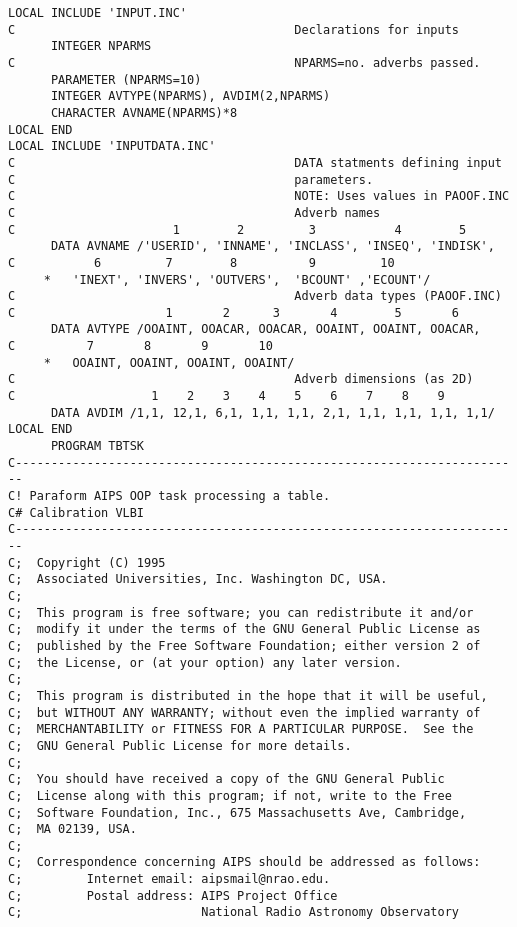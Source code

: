 {\small\begin{verbatim}
LOCAL INCLUDE 'INPUT.INC'
C                                       Declarations for inputs
      INTEGER NPARMS
C                                       NPARMS=no. adverbs passed.
      PARAMETER (NPARMS=10)
      INTEGER AVTYPE(NPARMS), AVDIM(2,NPARMS)
      CHARACTER AVNAME(NPARMS)*8
LOCAL END
LOCAL INCLUDE 'INPUTDATA.INC'
C                                       DATA statments defining input
C                                       parameters.
C                                       NOTE: Uses values in PAOOF.INC
C                                       Adverb names
C                      1        2         3           4        5
      DATA AVNAME /'USERID', 'INNAME', 'INCLASS', 'INSEQ', 'INDISK',
C           6         7        8          9         10
     *   'INEXT', 'INVERS', 'OUTVERS',  'BCOUNT' ,'ECOUNT'/
C                                       Adverb data types (PAOOF.INC)
C                     1       2      3       4        5       6
      DATA AVTYPE /OOAINT, OOACAR, OOACAR, OOAINT, OOAINT, OOACAR,
C          7       8       9       10
     *   OOAINT, OOAINT, OOAINT, OOAINT/
C                                       Adverb dimensions (as 2D)
C                   1    2    3    4    5    6    7    8    9
      DATA AVDIM /1,1, 12,1, 6,1, 1,1, 1,1, 2,1, 1,1, 1,1, 1,1, 1,1/
LOCAL END
      PROGRAM TBTSK
C-----------------------------------------------------------------------
C! Paraform AIPS OOP task processing a table.
C# Calibration VLBI
C-----------------------------------------------------------------------
C;  Copyright (C) 1995
C;  Associated Universities, Inc. Washington DC, USA.
C;
C;  This program is free software; you can redistribute it and/or
C;  modify it under the terms of the GNU General Public License as
C;  published by the Free Software Foundation; either version 2 of
C;  the License, or (at your option) any later version.
C;
C;  This program is distributed in the hope that it will be useful,
C;  but WITHOUT ANY WARRANTY; without even the implied warranty of
C;  MERCHANTABILITY or FITNESS FOR A PARTICULAR PURPOSE.  See the
C;  GNU General Public License for more details.
C;
C;  You should have received a copy of the GNU General Public
C;  License along with this program; if not, write to the Free
C;  Software Foundation, Inc., 675 Massachusetts Ave, Cambridge,
C;  MA 02139, USA.
C;
C;  Correspondence concerning AIPS should be addressed as follows:
C;         Internet email: aipsmail@nrao.edu.
C;         Postal address: AIPS Project Office
C;                         National Radio Astronomy Observatory

\end{verbatim}}
